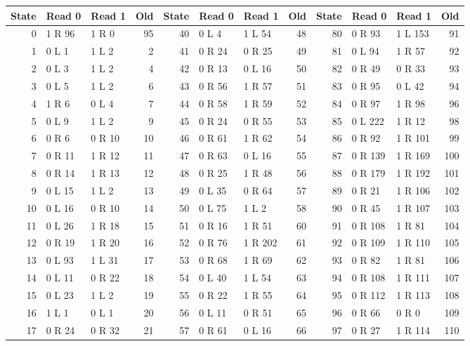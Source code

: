 \begingroup\small
\setlength{\tabcolsep}{4pt}
\begin{center}
\begin{tabular}{@{}rllr@{\hspace{12pt}}rllr@{\hspace{12pt}}rllr@{}}
\toprule
State & Read 0 & Read 1 & Old & State & Read 0 & Read 1 & Old & State & Read 0 & Read 1 & Old\\
\midrule
0 & 1 R 96 & 1 R 0 & 95 & 40 & 0 L 4 & 1 L 54 & 48 & 80 & 0 R 93 & 1 L 153 & 91\\
1 & 0 L 1 & 1 L 2 & 2 & 41 & 0 R 24 & 0 R 25 & 49 & 81 & 0 L 94 & 1 R 57 & 92\\
2 & 0 L 3 & 1 L 2 & 4 & 42 & 0 R 13 & 0 L 16 & 50 & 82 & 0 R 49 & 0 R 33 & 93\\
3 & 0 L 5 & 1 L 2 & 6 & 43 & 0 R 56 & 1 R 57 & 51 & 83 & 0 R 95 & 0 L 42 & 94\\
4 & 1 R 6 & 0 L 4 & 7 & 44 & 0 R 58 & 1 R 59 & 52 & 84 & 0 R 97 & 1 R 98 & 96\\
5 & 0 L 9 & 1 L 2 & 9 & 45 & 0 R 24 & 0 R 55 & 53 & 85 & 0 L 222 & 1 R 12 & 98\\
6 & 0 R 6 & 0 R 10 & 10 & 46 & 0 R 61 & 1 R 62 & 54 & 86 & 0 R 92 & 1 R 101 & 99\\
7 & 0 R 11 & 1 R 12 & 11 & 47 & 0 R 63 & 0 L 16 & 55 & 87 & 0 R 139 & 1 R 169 & 100\\
8 & 0 R 14 & 1 R 13 & 12 & 48 & 0 R 25 & 1 R 48 & 56 & 88 & 0 R 179 & 1 R 192 & 101\\
9 & 0 L 15 & 1 L 2 & 13 & 49 & 0 L 35 & 0 R 64 & 57 & 89 & 0 R 21 & 1 R 106 & 102\\
10 & 0 L 16 & 0 R 10 & 14 & 50 & 0 L 75 & 1 L 2 & 58 & 90 & 0 R 45 & 1 R 107 & 103\\
11 & 0 L 26 & 1 R 18 & 15 & 51 & 0 R 16 & 1 R 51 & 60 & 91 & 0 R 108 & 1 R 81 & 104\\
12 & 0 R 19 & 1 R 20 & 16 & 52 & 0 R 76 & 1 R 202 & 61 & 92 & 0 R 109 & 1 R 110 & 105\\
13 & 0 L 93 & 1 L 31 & 17 & 53 & 0 R 68 & 1 R 69 & 62 & 93 & 0 R 82 & 1 R 81 & 106\\
14 & 0 L 11 & 0 R 22 & 18 & 54 & 0 L 40 & 1 L 54 & 63 & 94 & 0 R 108 & 1 R 111 & 107\\
15 & 0 L 23 & 1 L 2 & 19 & 55 & 0 R 22 & 1 R 55 & 64 & 95 & 0 R 112 & 1 R 113 & 108\\
16 & 1 L 1 & 0 L 1 & 20 & 56 & 0 L 11 & 0 R 51 & 65 & 96 & 0 R 66 & 0 R 0 & 109\\
17 & 0 R 24 & 0 R 32 & 21 & 57 & 0 R 61 & 0 L 16 & 66 & 97 & 0 R 27 & 1 R 114 & 110\\

\end{tabular}
\end{center}
